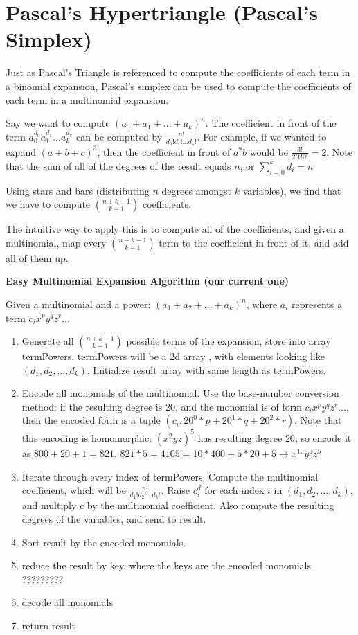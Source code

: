 \documentclass{article}
\begin{document}
\section{Pascal's Hypertriangle (Pascal's Simplex)}
Just as Pascal's Triangle is referenced to compute the coefficients of each term in a binomial expansion, Pascal's simplex can be used to compute the coefficients of each term in a multinomial expansion.

Say we want to compute $(a_0 + a_1 + ... + a_k)^n$. The coefficient in front of the term $a_0^{d_0}a_1^{d_1}...a_k^{d_k}$ can be computed by $\frac{n!}{d_0!d_1!...d_k!}$. For example, if we wanted to expand $(a + b + c)^3$, then the coefficient in front of $a^2 b$ would be $\frac{3!}{2!1!0!}=2$. Note that the sum of all of the degrees of the result equals $n$, or $\sum_{i=0}^{k} d_i=n$

Using stars and bars (distributing $n$ degrees amongst $k$ variables), we find that we have to compute $n + k - 1 \choose k-1$ coefficients.

The intuitive way to apply this is to compute all of the coefficients, and given a multinomial, map every $n + k - 1 \choose k-1$ term to the coefficient in front of it, and add all of them up.

\textbf{Easy Multinomial Expansion Algorithm (our current one)}

Given a multinomial and a power: $(a_1 + a_2 + ... + a_k)^n$, where $a_i$ represents a term $c_ix^py^qz^r...$

\begin{enumerate}
    \item Generate all $\binom{n+k-1}{k-1}$ possible terms of the expansion, store into array termPowers. termPowers will be a 2d array , with elements looking like $(d_1, d_2, ... , d_k)$. Initialize result array with same length as termPowers.
    \item Encode all monomials of the multinomial. Use the base-number conversion method: if the resulting degree is 20, and the monomial is of form $c_ix^py^qz^r...$, then the encoded form is a tuple $(c_i, 20^0 * p + 20^1 * q + 20^2 * r)$. Note that this encoding is homomorphic: $(x^2yz)^5$ has resulting degree $20$, so encode it as $800 + 20 + 1 = 821$. $821*5 = 4105 = 10 * 400 + 5 * 20 + 5 \rightarrow x^{10}y^5z^5$
    \item Iterate through every index of termPowers. Compute the multinomial coefficient, which will be $\frac{n!}{d_1!d_2!...d_k!}$. Raise $c^d_i$ for each index $i$ in $(d_1, d_2, ... , d_k)$, and multiply $c$ by the multinomial coefficient. Also compute the resulting degrees of the variables, and send to result.
    \item Sort result by the encoded monomials.
    \item reduce the result by key, where the keys are the encoded monomials ?????????
    \item decode all monomials
    \item return result
\end{enumerate}
\end{document}
